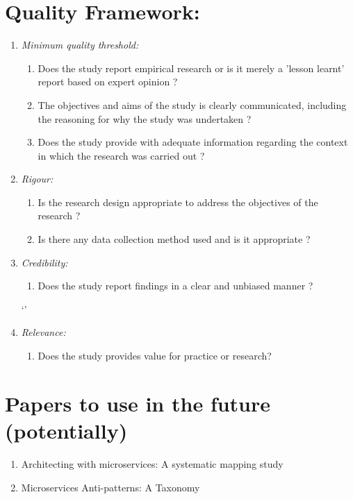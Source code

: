 \documentclass{article}
\theoremstyle{mytheoremstyle}
\theoremstyle{mytheoremstyle}
\theoremstyle{myproblemstyle}
\begin{document}
      \section{Quality Framework:}
      \begin{enumerate}
        \item \emph{Minimum quality threshold:} 
        \begin{enumerate}
            \item Does the study report empirical research or is it merely a 'lesson learnt' report based on expert opinion ?  
            \item The objectives and aims of the study is clearly communicated, including the reasoning for why the study was undertaken ?  
            \item Does the study provide with adequate information regarding the context in which the research was carried out ? 
        \end{enumerate}
        \item \emph{Rigour:}
        \begin{enumerate}
            \item Is the research design appropriate to address the objectives of the research ? 
            \item Is there any data collection method used and is it appropriate ? 
        \end{enumerate}
        \item \emph{Credibility:}
          \begin{enumerate}
            \item Does the study report findings in a clear and unbiased manner ? 
         \end{enumerate}`'
        \item \emph{Relevance:}
        \begin{enumerate}
            \item Does the study provides value for practice or research? 
         \end{enumerate}
    \end{enumerate}


    \section{Papers to use in the future (potentially)}
    \begin{enumerate}
      \item Architecting with microservices: A systematic mapping study
      \item Microservices Anti-patterns: A Taxonomy
    \end{enumerate}
\end{document}
